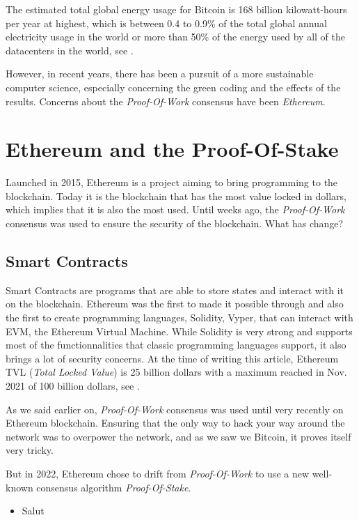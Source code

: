 \documentclass{ifacconf}
\begin{document}
 The estimated total global energy usage for Bitcoin is 168 billion kilowatt-hours per year at highest, which is between 0.4 to 0.9\% of the total global annual electricity usage in the world or more than 50\% of the energy used by all of the datacenters in the world, see \cite{TowGreen:21}.

However, in recent years, there has been a pursuit of a more sustainable computer science, especially concerning the green coding and the effects of the results. Concerns about the \textit{Proof-Of-Work} consensus have been \textit{Ethereum}.

\section{Ethereum and the Proof-Of-Stake}

Launched in 2015, Ethereum is a project aiming to bring programming to the blockchain. Today it is the blockchain that has the most value locked in dollars, which implies that it is also the most used. Until weeks ago, the \textit{Proof-Of-Work} consensus was used to ensure the security of the blockchain. What has change?

\subsection{Smart Contracts}
Smart Contracts are programs that are able to store states and interact with it on the blockchain. Ethereum was the first to made it possible through and also the first to create programming languages, Solidity, Vyper, that can interact with EVM, the Ethereum Virtual Machine. While Solidity is very strong and supports most of the functionnalities that classic programming languages support, it also brings a lot of security concerns. At the time of writing this article, Ethereum TVL (\textit{Total Locked Value}) is 25 billion dollars with a maximum reached in Nov. 2021 of 100 billion dollars, see \citep[reference.][]{DefiLlama:22}.

As we said earlier on, \textit{Proof-Of-Work} consensus was used until very recently on Ethereum blockchain. Ensuring that the only way to hack your way around the network was to overpower the network, and as we saw we Bitcoin, it proves itself very tricky. 

But in 2022, Ethereum chose to drift from \textit{Proof-Of-Work} to use a new well-known consensus algorithm \textit{Proof-Of-Stake}.

\begin{itemize}
    \item Salut
\end{itemize}
\end{document}
